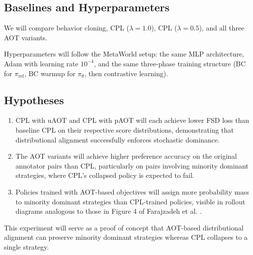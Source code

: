 \documentclass[11pt]{article}
\begin{document}
\subsection{Baselines and Hyperparameters}

We will compare behavior cloning, CPL ($\lambda=1.0$), CPL ($\lambda=0.5$), and all three AOT variants.

Hyperparameters will follow the MetaWorld setup: the same MLP architecture, Adam with learning rate $10^{-4}$, and the same three-phase training structure (BC for $\pi_{\text{ref}}$, BC warmup for $\pi_\theta$, then contrastive learning).

\subsection{Hypotheses}

\begin{enumerate}
    \item CPL with uAOT and CPL with pAOT will each achieve lower FSD loss than baseline CPL on their respective score distributions, demonstrating that distributional alignment successfully enforces stochastic dominance.
    \item The AOT variants will achieve higher preference accuracy on the original annotator pairs than CPL, particularly on pairs involving minority dominant strategies, where CPL’s collapsed policy is expected to fail.
    \item Policies trained with AOT-based objectives will assign more probability mass to minority dominant strategies than CPL-trained policies, visible in rollout diagrams analogous to those in Figure 4 of Farajzadeh et al. \cite{farajzadeh2025psd}.
\end{enumerate}

This experiment will serve as a proof of concept that AOT-based distributional alignment can preserve minority dominant strategies whereas CPL collapses to a single strategy.
\end{document}
